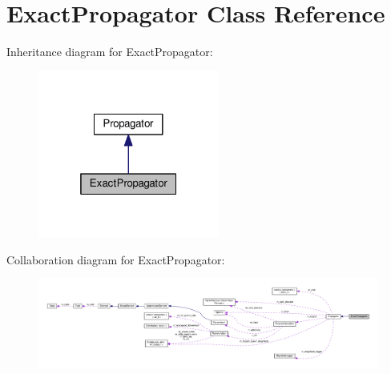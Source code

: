 \hypertarget{classExactPropagator}{}\section{Exact\+Propagator Class Reference}
\label{classExactPropagator}


Inheritance diagram for Exact\+Propagator\+:
\nopagebreak
\begin{figure}[H]
\begin{center}
\leavevmode
\includegraphics[width=169pt]{classExactPropagator__inherit__graph}
\end{center}
\end{figure}


Collaboration diagram for Exact\+Propagator\+:
\nopagebreak
\begin{figure}[H]
\begin{center}
\leavevmode
\includegraphics[width=350pt]{classExactPropagator__coll__graph}
\end{center}
\end{figure}
